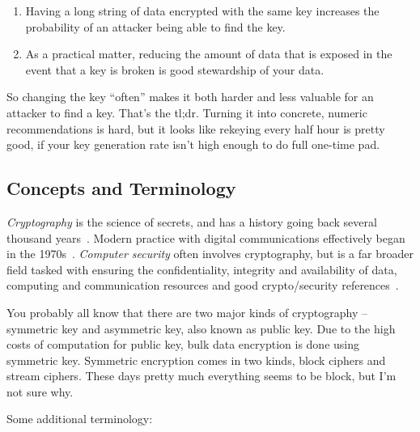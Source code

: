 \documentclass[%
 aip,
 jmp,%
 amsmath,amssymb,
 reprint,%
]{revtex4-1}
\begin{document}
\begin{enumerate}
\item Having a long string of data encrypted with the same key increases
the probability of an attacker being able to find the key.
\item As a practical matter, reducing the amount of data that is exposed
in the event that a key is broken is good stewardship of your data.
\end{enumerate}

So changing the key ``often'' makes it both harder and less valuable
for an attacker to find a key.  That's the tl;dr.  Turning it into
concrete, numeric recommendations is hard, but it looks like rekeying
every half hour is pretty good, if your key generation rate isn't high
enough to do full one-time pad.

\subsection{Concepts and Terminology}

\emph{Cryptography} is the science of secrets, and has a history going
back several thousand years~\cite{kahn1996codebreakers,singh1999code}.
Modern practice with digital communications effectively began in the
1970s~\cite{schneier96:_applied_crypto,menezes1996handbook}.
\emph{Computer security} often involves cryptography, but is a far
broader field tasked with ensuring the confidentiality, integrity and
availability of data, computing and communication resources
 and good  crypto/security references~\cite{bishop2002art}.

You probably all know that there are two major kinds of cryptography
-- symmetric key and asymmetric key, also known as public key.  Due to
the high costs of computation for public key, bulk data encryption is
done using symmetric key.  Symmetric encryption comes in two kinds,
block ciphers and stream ciphers.  These days pretty much everything
seems to be block, but I'm not sure why.

Some additional terminology:
\end{document}
